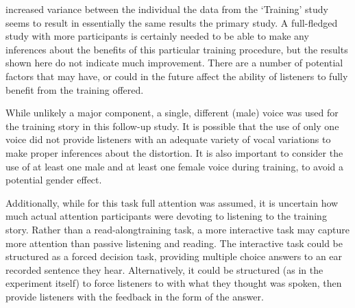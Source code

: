 \DIFdelbegin {}\DIFdelend \DIFaddbegin {}\DIFaddend increased variance between the individual \DIFdelbegin {}\DIFdelend \DIFaddbegin {}\DIFaddend the data from the `\DIFaddbegin {}\DIFaddend Training' study seems to result in essentially the same results the primary study.  A full-fledged study with more participants is certainly needed to be able to make any inferences about the benefits of this particular training procedure, but the results shown here do not indicate much improvement.  There are a number of potential factors that may have, or could in the future affect the ability of listeners to fully benefit from the training offered.  

While unlikely a major component, a single, different (male) voice was used for the training story in this follow-up study.  It is possible that the use of only one voice did not provide listeners with an adequate variety of vocal variations to make proper inferences about the distortion.  It is also important to consider the use of at least one male and at least one female voice during training, to avoid a potential gender effect.

Additionally, while for this task full attention was assumed, it is uncertain how much actual attention participants were devoting to listening to the training story.  Rather than a \DIFdelbegin {}\DIFdelend \DIFaddbegin {}\DIFaddend read-along\DIFdelbegin {}\DIFdelend \DIFaddbegin {}\DIFaddend training task, a more interactive task may capture more attention than passive listening and reading.  The interactive task could be structured as a forced decision task, providing multiple choice answers to an ear recorded sentence they hear.  Alternatively, it could be structured (as in the experiment itself) to force listeners to \DIFdelbegin {}\DIFdelend \DIFaddbegin {}\DIFaddend with what they thought was spoken, then provide listeners with the feedback in the form of the answer.  

